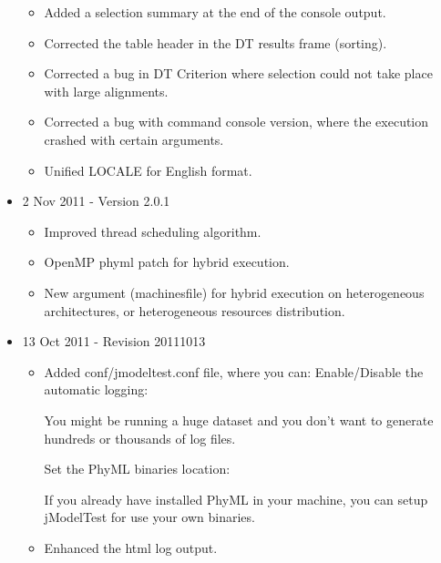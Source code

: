 \documentclass[11pt,twoside,a4paper]{article}
\begin{document}
\begin{itemize}
	\begin{itemize}
		\item Added a selection summary at the end of the console output.
		\item Corrected the table header in the DT results frame (sorting).
		\item Corrected a bug in DT Criterion where selection could not take place with large alignments.
		\item Corrected a bug with command console version, where the execution crashed with certain arguments.
		\item Unified LOCALE for English format. 
	\end{itemize}

	\item 2 Nov 2011 - Version 2.0.1

	\begin{itemize}
		\item Improved thread scheduling algorithm.
		\item OpenMP phyml patch for hybrid execution.
		\item New argument (machinesfile) for hybrid execution on heterogeneous architectures, or heterogeneous resources distribution. 
	\end{itemize}

	\item 13 Oct 2011 - Revision 20111013

	\begin{itemize}
		\item Added conf/jmodeltest.conf file, where you can:
			Enable/Disable the automatic logging:

			    You might be running a huge dataset and you don't want to generate hundreds or thousands of log files. 

			Set the PhyML binaries location:

			    If you already have installed PhyML in your machine, you can setup jModelTest for use your own binaries. 

		\item Enhanced the html log output. 
	\end{itemize}

\end{itemize}




\end{document}
